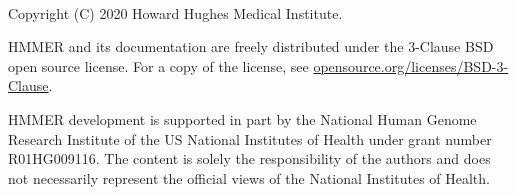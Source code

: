 \newpage
\begin{fullwidth}
  ~\vfill
  \thispagestyle{empty}
  \setlength{\parindent}{0pt}
  \setlength{\parskip}{\baselineskip}

\par
Copyright (C) 2020 Howard Hughes Medical Institute.

\par
HMMER and its documentation are freely distributed
under the 3-Clause BSD open source license. For a copy of the license,
see \href{https://opensource.org/licenses/BSD-3-Clause}{opensource.org/licenses/BSD-3-Clause}.

\par
HMMER development is supported in part by the National Human
Genome Research Institute of the US National Institutes of Health under
grant number R01HG009116. The content is solely the responsibility
of the authors and does not necessarily represent the official views of
the National Institutes of Health.

\end{fullwidth}




